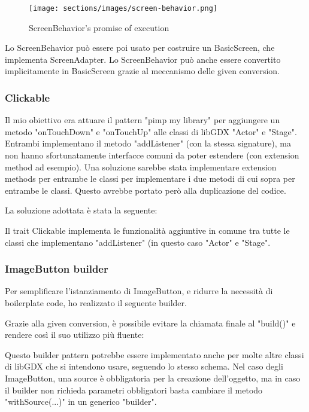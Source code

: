 

\begin{figure}[H]
    \centering
    \caption{ScreenBehavior's promise of execution}
    \texttt{[image: sections/images/screen-behavior.png]}
    \label{ScreenBehavior}
\end{figure}


Lo ScreenBehavior può essere poi usato per costruire un BasicScreen, che implementa ScreenAdapter. Lo ScreenBehavior può anche essere convertito implicitamente in BasicScreen grazie al meccanismo delle given conversion.


\subsubsection{Clickable}
Il mio obiettivo era attuare il pattern "pimp my library" per aggiungere un metodo "onTouchDown" e "onTouchUp" alle classi di libGDX "Actor" e "Stage".
Entrambi implementano il metodo "addListener" (con la stessa signature), ma non hanno sfortunatamente interfacce comuni da poter estendere (con extension method ad esempio).
Una soluzione sarebbe stata implementare extension methods per entrambe le classi per implementare i due metodi di cui sopra per entrambe le classi. Questo avrebbe portato però alla duplicazione del codice.

La soluzione adottata è stata la seguente:



Il trait Clickable implementa le funzionalità aggiuntive in comune tra tutte le classi che implementano "addListener" (in questo caso "Actor" e "Stage".

\subsubsection{ImageButton builder}
Per semplificare l'istanziamento di ImageButton, e ridurre la necessità di boilerplate code, ho realizzato il seguente builder.



Grazie alla given conversion, è possibile evitare la chiamata finale al "build()" e rendere così il suo utilizzo più fluente:



Questo builder pattern potrebbe essere implementato anche per molte altre classi di libGDX che si intendono usare, seguendo lo stesso schema.
Nel caso degli ImageButton, una source è obbligatoria per la creazione dell'oggetto, ma in caso il builder non richieda parametri obbligatori basta cambiare il metodo "withSource(...)" in un generico "builder".



